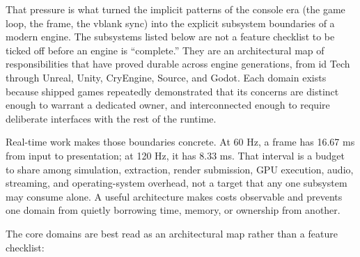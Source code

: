 \documentclass[
  11pt,
  letterpaper,
  DIV=11,
  numbers=noendperiod,
  twoside,
  open=right]{scrreprt}
\begin{document}
That pressure is what turned the implicit patterns of the console era
(the game loop, the frame, the vblank sync) into the explicit subsystem
boundaries of a modern engine. The subsystems listed below are not a
feature checklist to be ticked off before an engine is ``complete.''
They are an architectural map of responsibilities that have proved
durable across engine generations, from id Tech through Unreal, Unity,
CryEngine, Source, and Godot. Each domain exists because shipped games
repeatedly demonstrated that its concerns are distinct enough to warrant
a dedicated owner, and interconnected enough to require deliberate
interfaces with the rest of the runtime.

Real-time work makes those boundaries concrete. At 60 Hz, a frame has
16.67 ms from input to presentation; at 120 Hz, it has 8.33 ms. That
interval is a budget to share among simulation, extraction, render
submission, GPU execution, audio, streaming, and operating-system
overhead, not a target that any one subsystem may consume alone. A
useful architecture makes costs observable and prevents one domain from
quietly borrowing time, memory, or ownership from another.

The core domains are best read as an architectural map rather than a
feature checklist:
\end{document}
